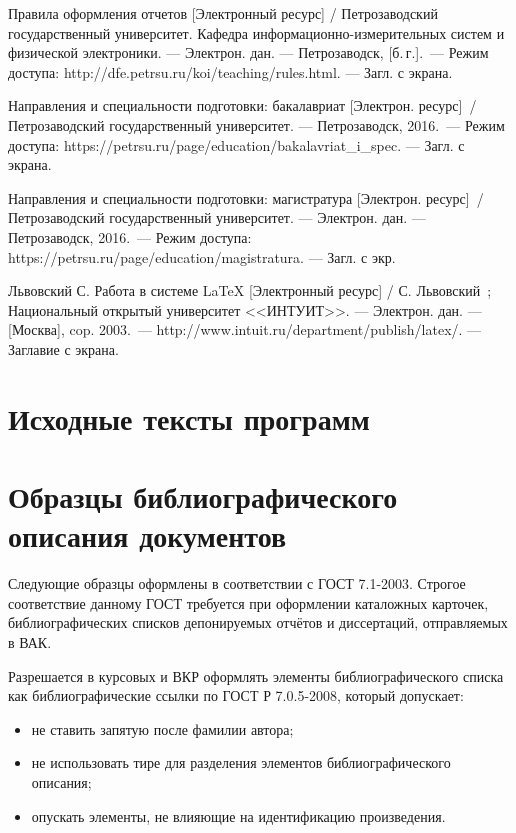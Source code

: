 \documentclass[utf8,14pt, coursreport]{G7-32}
\begin{document}
\begin{thebibliography}{99}
 Правила оформления отчетов [Электронный ресурс] / Петрозаводский государственный университет. Кафедра информационно-измерительных систем и физической электроники. --- Электрон. дан. --- Петрозаводск, [б.\,г.].~--- Режим доступа: http://dfe.petrsu.ru/koi/teaching/rules.html. --- Загл. с экрана.

 Направления и специальности подготовки: бакалавриат [Электрон. ресурс]~/ Петрозаводский государственный университет. --- Петрозаводск, 2016.~--- Режим доступа: https://petrsu.ru/page/education/bakalavriat\_i\_spec. --- Загл. с экрана.

 Направления и специальности подготовки: магистратура [Электрон. ресурс]~/ Петрозаводский государственный университет. --- Электрон. дан. --- Петрозаводск, 2016.~--- Режим доступа: https://petrsu.ru/page/education/magistratura. --- Загл. с экр.

 Львовский С. Работа в системе LaTeX [Электронный ресурс] / С. Львовский~; Национальный открытый университет <<ИНТУИТ>>. --- Электрон. дан. --- [Москва], cop. 2003.~--- http://www.intuit.ru/department/publish/latex/. --- Заглавие с экрана.

\end{thebibliography}


\appendix

\chapter{Исходные тексты программ}



\chapter{Образцы библиографического описания документов}

Следующие образцы оформлены в соответствии с ГОСТ 7.1-2003. Строгое соответствие данному ГОСТ требуется при оформлении каталожных карточек, библиографических списков депонируемых отчётов и диссертаций, отправляемых в ВАК. 

Разрешается в курсовых и ВКР оформлять элементы библиографического списка как библиографические ссылки по ГОСТ Р 7.0.5-2008, который допускает:
\begin{itemize}
\item не ставить запятую после фамилии автора;
\item не использовать тире для разделения элементов библиографического описания;
\item опускать элементы, не влияющие на идентификацию произведения.
\end{itemize}
\end{document}
